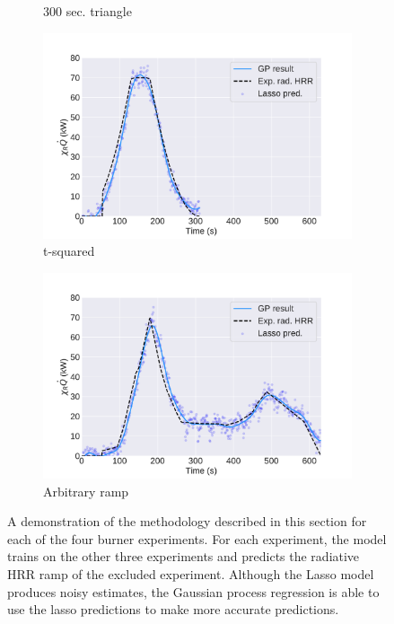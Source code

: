 \documentclass{article}
\begin{document}
\begin{figure}[htbp]
\begin{subfigure}[t]{.45\textwidth}
      \caption{300 sec. triangle}
      \label{fig:dft_result_300s_triangle}
  \end{subfigure}
   \begin{subfigure}[t]{.45\textwidth}
      \centering
      \includegraphics[width=\textwidth ,keepaspectratio]{figures/dft_result_t_squared.pdf}
      \caption{t-squared}
      \label{fig:dft_result_t_squared}
  \end{subfigure}
    \begin{subfigure}[t]{.45\textwidth}
      \centering
      \includegraphics[width=\textwidth ,keepaspectratio]{figures/dft_result_weird_curve.pdf}
      \caption{Arbitrary ramp}
      \label{fig:dft_result_weird_curve}
  \end{subfigure}
  \caption{A demonstration of the methodology described in this section for each of the four burner experiments. For each experiment, the model trains on the other three experiments and predicts the radiative HRR ramp of the excluded experiment. Although the Lasso model produces noisy estimates, the Gaussian process regression is able to use the lasso predictions to make more accurate predictions.} 
  \label{fig:dft_gp_results}
\end{figure}
\end{document}
